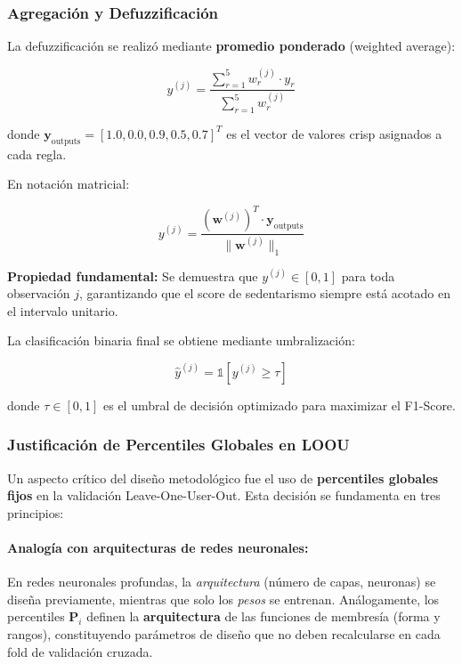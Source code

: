 \subsubsection{Agregación y Defuzzificación}
\label{subsubsec:agregacion_defuzz}

La defuzzificación se realizó mediante \textbf{promedio ponderado} (weighted average):

\begin{equation}
y^{(j)} = \frac{\sum_{r=1}^{5} w_r^{(j)} \cdot y_r}{\sum_{r=1}^{5} w_r^{(j)}}
\label{eq:defuzzificacion}
\end{equation}

donde \(\mathbf{y}_{\text{outputs}} = [1.0, 0.0, 0.9, 0.5, 0.7]^T\) es el vector de valores crisp asignados a cada regla.

En notación matricial:

\begin{equation}
y^{(j)} = \frac{(\mathbf{w}^{(j)})^T \cdot \mathbf{y}_{\text{outputs}}}{\|\mathbf{w}^{(j)}\|_1}
\label{eq:defuzz_matricial}
\end{equation}

\textbf{Propiedad fundamental:} Se demuestra que \(y^{(j)} \in [0, 1]\) para toda observación \(j\), garantizando que el score de sedentarismo siempre está acotado en el intervalo unitario.

La clasificación binaria final se obtiene mediante umbralización:

\begin{equation}
\hat{y}^{(j)} = \mathbb{1}[y^{(j)} \geq \tau]
\label{eq:binarizacion}
\end{equation}

donde \(\tau \in [0, 1]\) es el umbral de decisión optimizado para maximizar el F1-Score.

\subsubsection{Justificación de Percentiles Globales en LOOU}
\label{subsubsec:percentiles_globales}

Un aspecto crítico del diseño metodológico fue el uso de \textbf{percentiles globales fijos} en la validación Leave-One-User-Out. Esta decisión se fundamenta en tres principios:

\paragraph{Analogía con arquitecturas de redes neuronales:}
En redes neuronales profundas, la \textit{arquitectura} (número de capas, neuronas) se diseña previamente, mientras que solo los \textit{pesos} se entrenan. Análogamente, los percentiles \(\mathbf{P}_i\) definen la \textbf{arquitectura} de las funciones de membresía (forma y rangos), constituyendo parámetros de diseño que no deben recalcularse en cada fold de validación cruzada.

